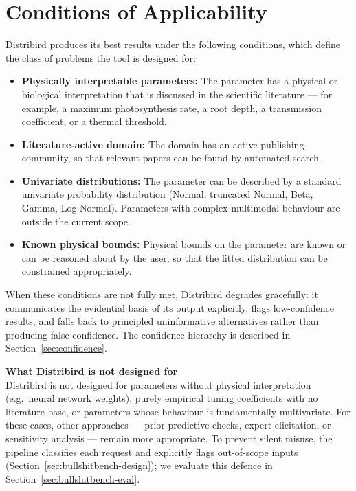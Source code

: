 \documentclass[11pt,a4paper]{article}
\begin{document}
\section{Conditions of Applicability}

Distribird produces its best results under the following conditions, which define the class of
problems the tool is designed for:

\begin{itemize}
  \item \textbf{Physically interpretable parameters:} The parameter has a physical or biological
    interpretation that is discussed in the scientific literature --- for example, a maximum
    photosynthesis rate, a root depth, a transmission coefficient, or a thermal threshold.

  \item \textbf{Literature-active domain:} The domain has an active publishing community, so that
    relevant papers can be found by automated search.

  \item \textbf{Univariate distributions:} The parameter can be described by a standard univariate
    probability distribution (Normal, truncated Normal, Beta, Gamma, Log-Normal). Parameters with
    complex multimodal behaviour are outside the current scope.

  \item \textbf{Known physical bounds:} Physical bounds on the parameter are known or can be
    reasoned about by the user, so that the fitted distribution can be constrained appropriately.
\end{itemize}

When these conditions are not fully met, Distribird degrades gracefully: it communicates the
evidential basis of its output explicitly, flags low-confidence results, and falls back to
principled uninformative alternatives rather than producing false confidence. The confidence
hierarchy is described in Section~\ref{sec:confidence}.

\begin{mdframed}[style=calloutbox]
  \textbf{What Distribird is not designed for}\\[4pt]
  Distribird is not designed for parameters without physical interpretation (e.g.\ neural network
  weights), purely empirical tuning coefficients with no literature base, or parameters whose
  behaviour is fundamentally multivariate. For these cases, other approaches --- prior predictive
  checks, expert elicitation, or sensitivity analysis --- remain more appropriate. To prevent
  silent misuse, the pipeline classifies each request and explicitly flags out-of-scope inputs
  (Section~\ref{sec:bullshitbench-design}); we evaluate this defence in
  Section~\ref{sec:bullshitbench-eval}.
\end{mdframed}
\end{document}
